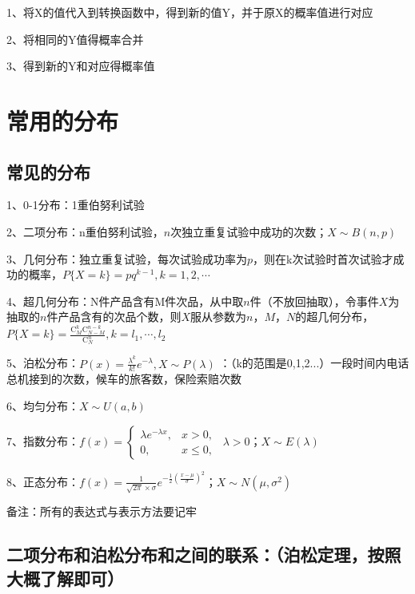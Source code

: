 1、将X的值代入到转换函数中，得到新的值Y，并于原X的概率值进行对应

2、将相同的Y值得概率合并

3、得到新的Y和对应得概率值

\section{常用的分布}



\subsection{常见的分布}

1、0-1分布：1重伯努利试验

2、二项分布：n重伯努利试验，$n$次独立重复试验中成功的次数；$X \sim B(n,p)$

3、几何分布：独立重复试验，每次试验成功率为$p$，则在k次试验时首次试验才成功的概率，$P\{X=k\}=p q^{k-1}, k=1,2, \cdots$

4、超几何分布：N件产品含有M件次品，从中取$n$件（不放回抽取），令事件$X$为抽取的$n$件产品含有的次品个数，则$X$服从参数为$n$，$M$，$N$的超几何分布，$P\{X=k\}=\frac{\mathrm{C}_{M}^{k} \mathrm{C}_{N-M}^{n-k}}{\mathrm{C}_{N}^{n}}, k=l_{1}, \cdots, l_{2}$

5、泊松分布：$P(x) = \frac{\lambda^k}{k!}e^{-\lambda},X \sim P(\lambda)$ ：（k的范围是0,1,2...）一段时间内电话总机接到的次数，候车的旅客数，保险索赔次数

6、均匀分布：$X \sim U(a,b)$

7、指数分布：$f(x) = \begin{cases} \lambda e^{-\lambda x}, & x > 0, \\[5ex] 0, & x \le 0, \end{cases} \ \ \lambda >0$；$X \sim E(\lambda)$

8、正态分布：$f(x)=\frac{1}{\sqrt{{2\pi}}\times\sigma}e^{-\frac{1}{2}(\frac{x-\mu}{\sigma})^2}$；$X \sim N(\mu,\sigma^2)$



备注：所有的表达式与表示方法要记牢



\subsection{二项分布和泊松分布和之间的联系：（泊松定理，按照大概了解即可）}

